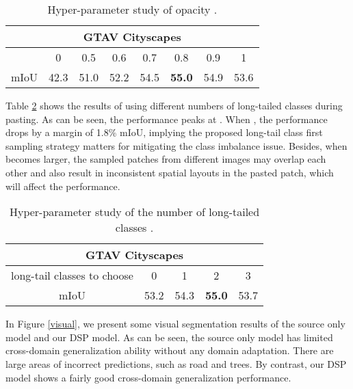 \documentclass[sigconf]{acmart}
\begin{document}
\begin{table}[htb]
    \centering
    \begin{tabular}{c|c|c|c|c|c|c|c}
    \hline
    \multicolumn{8}{c}{GTAV  Cityscapes}\\
    \hline
    \hline
        & 0& 0.5&0.6&0.7&0.8&0.9&1\\
      \hline
      mIoU   & 42.3&51.0&52.2&54.5&\textbf{55.0}&54.9&53.6\\
      \hline
    \end{tabular}
    \caption{Hyper-parameter study of opacity .}
    \label{opacity}
\end{table}


Table \ref{long-tail} shows the results of using different numbers of long-tailed classes  during pasting. As can be seen, the performance peaks at . When , the performance drops by a margin of 1.8\% mIoU, implying the proposed long-tail class first sampling strategy matters for mitigating the class imbalance issue. Besides, when  becomes larger, the sampled patches from different images may overlap each other and also result in inconsistent spatial layouts in the pasted patch, which will affect the performance.

\begin{table}[htb]
    \centering
    \begin{tabular}{c|c|c|c|c}
    \hline
    \multicolumn{5}{c}{GTAV  Cityscapes}\\
    \hline
    \hline
      long-tail classes to choose  & 0& 1&2&3\\
      \hline
      mIoU   &53.2&54.3&\textbf{55.0}&53.7\\
      \hline
    \end{tabular}
    \caption{Hyper-parameter study of the number of long-tailed classes .}
    \label{long-tail}
\end{table}

In Figure \ref{visual}, we present some visual segmentation results of the source only model and our DSP model. As can be seen, the source only model has limited cross-domain generalization ability without any domain adaptation. There are large areas of incorrect predictions, such as road and trees. By contrast, our DSP model shows a fairly good cross-domain generalization performance.
\end{document}
